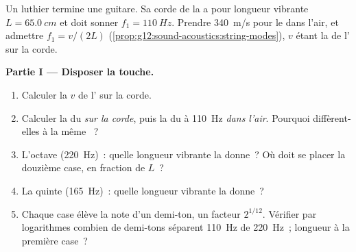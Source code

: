 \begin{problem}
\label{pb:g12:sound-acoustics:1}
Un luthier termine une guitare. Sa corde de la a pour longueur
vibrante $L = \qty{65.0}{cm}$ et doit sonner
$f_1 = \qty{110}{Hz}$. Prendre \qty{340}{m/s} pour le
 dans l'air, et admettre $f_1 = v/(2L)$
(\cref{prop:g12:sound-acoustics:string-modes}), $v$ étant la 
de l' sur la corde.

\medskip
\noindent\textbf{Partie I --- Disposer la touche.}
\begin{enumerate}
  \item Calculer la  $v$ de l' sur la corde.
  \item Calculer la  du
         \emph{sur la corde}, puis la
         du  à \qty{110}{Hz}
        \emph{dans l'air}. Pourquoi diffèrent-elles à la même
        ~?
  \item L'octave (\qty{220}{Hz})~: quelle longueur vibrante la donne~?
        Où doit se placer la douzième case, en fraction de $L$~?
  \item La quinte (\qty{165}{Hz})~: quelle longueur vibrante la donne~?
  \item Chaque case élève la note d'un demi-ton, un facteur
        $2^{1/12}$. Vérifier par logarithmes combien de demi-tons
        séparent \qty{110}{Hz} de \qty{220}{Hz}~; longueur à la première
        case~?
\end{enumerate}


\end{problem}

